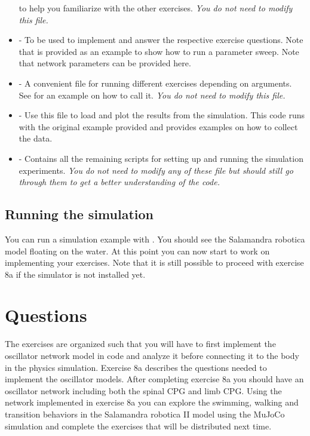 \documentclass{cmc}
\begin{document}
\begin{itemize}
  to help you familiarize with the other exercises. \textit{You do not need to
    modify this file.}
\item {} - To be used to implement and answer the
  respective exercise questions. Note that  is
  provided as an example to show how to run a parameter sweep. Note that network
  parameters can be provided here.
\item {} - A convenient file for running different
  exercises depending on arguments. See  for an example
  on how to call it. \textit{You do not need to modify this file.}
\item {} - Use this file to load and plot the
  results from the simulation. This code runs with the original example provided
  and provides examples on how to collect the data.
\item {} - Contains all the remaining
  scripts for setting up and running the simulation experiments. \textit{You do
    not need to modify any of these file but should still go through them to get
    a better understanding of the code.}
\end{itemize}



\subsection*{Running the simulation}
You can run a simulation example with . You
should see the Salamandra robotica model floating on the water. At this point
you can now start to work on implementing your exercises. Note that it is still
possible to proceed with exercise 8a if the simulator is not installed yet.


\section*{Questions}

The exercises are organized such that you will have to first implement the
oscillator network model in  code and analyze it before
connecting it to the body in the physics simulation.  Exercise 8a describes the
questions needed to implement the oscillator models. After completing exercise
8a you should have an oscillator network including both the spinal CPG and limb
CPG. Using the network implemented in exercise 8a you can explore the swimming,
walking and transition behaviors in the Salamandra robotica II model using the
MuJoCo simulation and complete the exercises that will be distributed next time.
\end{document}
